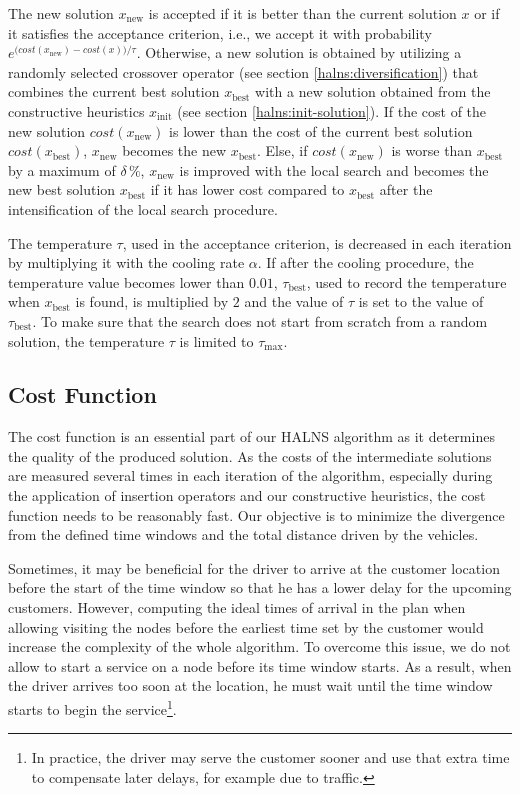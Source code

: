    The new solution $x_{\mathrm{new}}$ is accepted if it is better than the current solution $x$ or if it satisfies the acceptance criterion, i.e., we accept it with probability $e^{\big(cost(x_{\mathrm{new}}) - cost(x)\big)/\tau}$. Otherwise, a new solution is obtained by utilizing a randomly selected crossover operator (see section \ref{halns:diversification}) that combines the current best solution $x_{\mathrm{best}}$ with a new solution obtained from the constructive heuristics $x_{\mathrm{init}}$ (see section \ref{halns:init-solution}). If the cost of the new solution $cost(x_{\mathrm{new}})$ is lower than the cost of the current best solution $cost(x_{\mathrm{best}})$, $x_{\mathrm{new}}$ becomes the new $x_{\mathrm{best}}$. Else, if $cost(x_{\mathrm{new}})$ is worse than $x_{\mathrm{best}}$ by a maximum of $\delta\,\%$, $x_{\mathrm{new}}$ is improved with the local search and becomes the new best solution $x_{\mathrm{best}}$ if it has lower cost compared to $x_{\mathrm{best}}$ after the intensification of the local search procedure.
    
    The temperature $\tau$, used in the acceptance criterion, is decreased in each iteration by multiplying it with the cooling rate $\alpha$. If after the cooling procedure, the temperature value becomes lower than $0.01$, $\tau_{\mathrm{best}}$, used to record the temperature when $x_{\mathrm{best}}$ is found, is multiplied by $2$ and the value of $\tau$ is set to the value of $\tau_{\mathrm{best}}$. To make sure that the search does not start from scratch from a random solution, the temperature $\tau$ is limited to $\tau_{\mathrm{max}}$.
    
    \subsection{Cost Function} \label{halns:cost}
    
    The cost function is an essential part of our HALNS algorithm as it determines the quality of the produced solution. As the costs of the intermediate solutions are measured several times in each iteration of the algorithm, especially during the application of insertion operators and our constructive heuristics, the cost function needs to be reasonably fast. Our objective is to minimize the divergence from the defined time windows and the total distance driven by the vehicles.
    
    Sometimes, it may be beneficial for the driver to arrive at the customer location before the start of the time window so that he has a lower delay for the upcoming customers. However, computing the ideal times of arrival in the plan when allowing visiting the nodes before the earliest time set by the customer would increase the complexity of the whole algorithm. To overcome this issue, we do not allow to start a service on a node before its time window starts. As a result, when the driver arrives too soon at the location, he must wait until the time window starts to begin the service\footnote{In practice, the driver may serve the customer sooner and use that extra time to compensate later delays, for example due to traffic.}.
    
